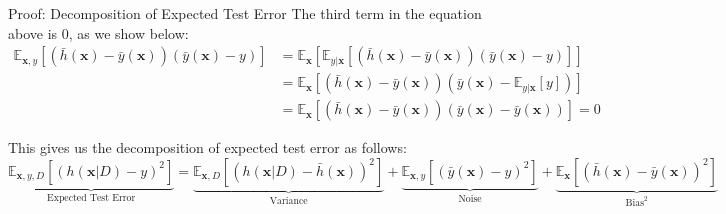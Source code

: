 \documentclass[serif, aspectratio=169]{beamer}
\begin{document}
\begin{frame}{Proof: Decomposition of Expected Test Error}
    The third term in the equation above is 0, as we show below:
    \begin{align*}
    \mathbb{E}_{\mathbf{x},y}\left[(\bar{h}(\mathbf{x}) - \bar{y}(\mathbf{x}))(\bar{y}(\mathbf{x}) - y)\right] 
    &= \mathbb{E}_{\mathbf{x}}\left[\mathbb{E}_{y|\mathbf{x}}\left[(\bar{h}(\mathbf{x}) - \bar{y}(\mathbf{x}))(\bar{y}(\mathbf{x}) - y)\right]\right] \\
    &= \mathbb{E}_{\mathbf{x}}\left[(\bar{h}(\mathbf{x}) - \bar{y}(\mathbf{x}))(\bar{y}(\mathbf{x}) - \mathbb{E}_{y|\mathbf{x}}[y])\right] \\
    &= \mathbb{E}_{\mathbf{x}}\left[(\bar{h}(\mathbf{x}) - \bar{y}(\mathbf{x}))(\bar{y}(\mathbf{x}) - \bar{y}(\mathbf{x}))\right] = 0
    \end{align*}
    
    This gives us the decomposition of expected test error as follows:
    \[
    \underbrace{\mathbb{E}_{\mathbf{x},y,D}\left[(h(\mathbf{x} \vert D) - y)^2\right]}_{\text{Expected Test Error}} 
    = \underbrace{\mathbb{E}_{\mathbf{x},D}\left[(h(\mathbf{x} \vert D) - \bar{h}(\mathbf{x}))^2\right]}_{\text{Variance}} 
    + \underbrace{\mathbb{E}_{\mathbf{x},y}\left[(\bar{y}(\mathbf{x}) - y)^2\right]}_{\text{Noise}} 
    + \underbrace{\mathbb{E}_{\mathbf{x}}\left[(\bar{h}(\mathbf{x}) - \bar{y}(\mathbf{x}))^2\right]}_{\text{Bias}^2}
    \]
\end{frame}
\end{document}
